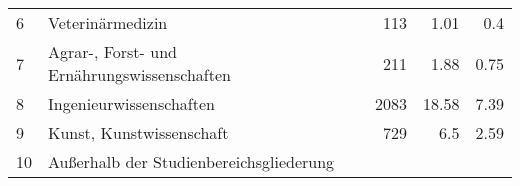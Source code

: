 \begin{longtable}{lXrrr}
     6 &
     \multicolumn{1}{X}{ Veterinärmedizin   } &


       \num{113} &
       \num[round-mode=places,round-precision=2]{1.01} &
         \num[round-mode=places,round-precision=2]{0.4} \\

     7 &
     \multicolumn{1}{X}{ Agrar-, Forst- und Ernährungswissenschaften   } &


       \num{211} &
       \num[round-mode=places,round-precision=2]{1.88} &
         \num[round-mode=places,round-precision=2]{0.75} \\

     8 &
     \multicolumn{1}{X}{ Ingenieurwissenschaften   } &


       \num{2083} &
       \num[round-mode=places,round-precision=2]{18.58} &
         \num[round-mode=places,round-precision=2]{7.39} \\

     9 &
     \multicolumn{1}{X}{ Kunst, Kunstwissenschaft   } &


       \num{729} &
       \num[round-mode=places,round-precision=2]{6.5} &
         \num[round-mode=places,round-precision=2]{2.59} \\

     10 &
     \multicolumn{1}{X}{ Außerhalb der Studienbereichsgliederung   } &



\end{longtable}
